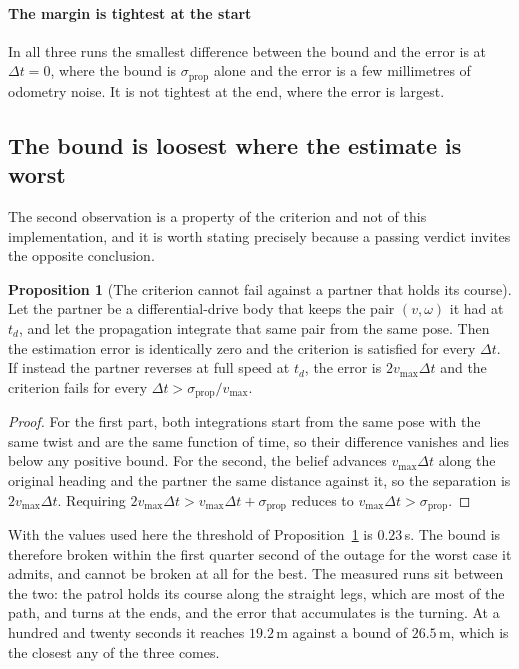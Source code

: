 \documentclass[11pt,a4paper]{article}
\theoremstyle{definition}
\newtheorem{proposition}{Proposition}
\begin{document}
\paragraph{The margin is tightest at the start} In all three runs the smallest
difference between the bound and the error is at $\Delta t = 0$, where the
bound is $\sigma_{\mathrm{prop}}$ alone and the error is a few millimetres of
odometry noise. It is not tightest at the end, where the error is largest.

\subsection{The bound is loosest where the estimate is worst}
\label{sec:loose}

The second observation is a property of the criterion and not of this
implementation, and it is worth stating precisely because a passing verdict
invites the opposite conclusion.

\begin{proposition}[The criterion cannot fail against a partner that holds its course]
\label{prop:course}
Let the partner be a differential-drive body that keeps the pair
$(v, \omega)$ it had at $t_{d}$, and let the propagation integrate that same
pair from the same pose. Then the estimation error is identically zero and the
criterion is satisfied for every $\Delta t$. If instead the partner reverses at
full speed at $t_{d}$, the error is $2 v_{\max} \Delta t$ and the criterion
fails for every $\Delta t > \sigma_{\mathrm{prop}} / v_{\max}$.
\end{proposition}

\begin{proof}
For the first part, both integrations start from the same pose with the same
twist and are the same function of time, so their difference vanishes and lies
below any positive bound. For the second, the belief advances $v_{\max}\Delta t$
along the original heading and the partner the same distance against it, so the
separation is $2 v_{\max}\Delta t$. Requiring
$2 v_{\max}\Delta t > v_{\max}\Delta t + \sigma_{\mathrm{prop}}$ reduces to
$v_{\max}\Delta t > \sigma_{\mathrm{prop}}$.
\end{proof}

With the values used here the threshold of Proposition~\ref{prop:course} is
$0.23$\,s. The bound is therefore broken within the first quarter second of the
outage for the worst case it admits, and cannot be broken at all for the best.
The measured runs sit between the two: the patrol holds its course along the
straight legs, which are most of the path, and turns at the ends, and the error
that accumulates is the turning. At a hundred and twenty seconds it reaches
$19.2$\,m against a bound of $26.5$\,m, which is the closest any of the three
comes.
\end{document}
